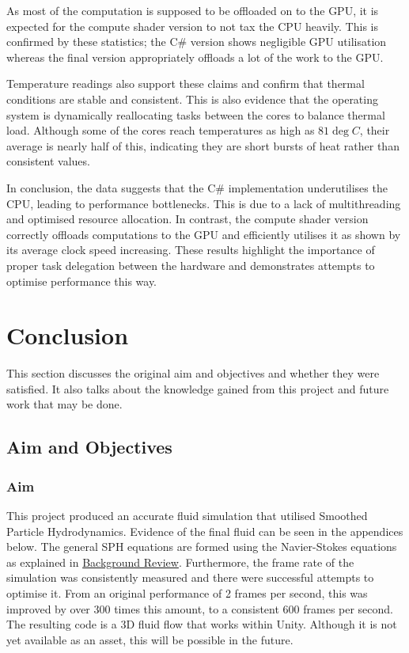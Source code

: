 \documentclass[a4paper, 12pt]{article}
\begin{document}
    As most of the computation is supposed to be offloaded on to the GPU, it is expected for the compute shader version to not tax the CPU heavily. This is confirmed by these statistics; the C\# version shows negligible GPU utilisation whereas the final version appropriately offloads a lot of the work to the GPU.

    Temperature readings also support these claims and confirm that thermal conditions are stable and consistent. This is also evidence that the operating system is dynamically reallocating tasks between the cores to balance thermal load. Although some of the cores reach temperatures as high as $81\deg C$, their average is nearly half of this, indicating they are short bursts of heat rather than consistent values.
    
    In conclusion, the data suggests that the C\# implementation underutilises the CPU, leading to performance bottlenecks. This is due to a lack of multithreading and optimised resource allocation. In contrast, the compute shader version correctly offloads computations to the GPU and efficiently utilises it as shown by its average clock speed increasing. These results highlight the importance of proper task delegation between the hardware and demonstrates attempts to optimise performance this way. 

    \newpage

    \section{Conclusion}
    \label{sec:conclusion}

    This section discusses the original aim and objectives and whether they were satisfied. It also talks about the knowledge gained from this project and future work that may be done.

    \subsection{Aim and Objectives}

    \subsubsection{Aim}

    This project produced an accurate fluid simulation that utilised Smoothed Particle Hydrodynamics. Evidence of the final fluid can be seen in the appendices below. The general SPH equations are formed using the Navier-Stokes equations as explained in \hyperref[sec:backgroundreview]{Background Review}. Furthermore, the frame rate of the simulation was consistently measured and there were successful attempts to optimise it. From an original performance of 2 frames per second, this was improved by over 300 times this amount, to a consistent 600 frames per second. The resulting code is a 3D fluid flow that works within Unity. Although it is not yet available as an asset, this will be possible in the future.
\end{document}
